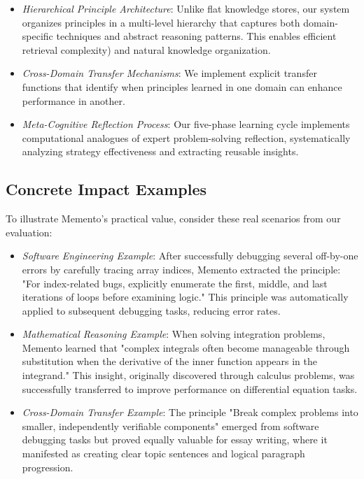 \documentclass[10pt,a4paper,twocolumn]{article}
\begin{document}
\begin{itemize}
\item \textit{Hierarchical Principle Architecture}: Unlike flat knowledge stores, our system organizes principles in a multi-level hierarchy that captures both domain-specific techniques and abstract reasoning patterns. This enables efficient retrieval complexity) and natural knowledge organization.

\item \textit{Cross-Domain Transfer Mechanisms}: We implement explicit transfer functions that identify when principles learned in one domain can enhance performance in another. 

\item \textit{Meta-Cognitive Reflection Process}: Our five-phase learning cycle implements computational analogues of expert problem-solving reflection, systematically analyzing strategy effectiveness and extracting reusable insights.
\end{itemize}

\subsection{Concrete Impact Examples}

To illustrate Memento's practical value, consider these real scenarios from our evaluation:

\begin{itemize}
\item \textit{Software Engineering Example}: After successfully debugging several off-by-one errors by carefully tracing array indices, Memento extracted the principle: "For index-related bugs, explicitly enumerate the first, middle, and last iterations of loops before examining logic." This principle was automatically applied to subsequent debugging tasks, reducing error rates.

\item \textit{Mathematical Reasoning Example}: When solving integration problems, Memento learned that "complex integrals often become manageable through substitution when the derivative of the inner function appears in the integrand." This insight, originally discovered through calculus problems, was successfully transferred to improve performance on differential equation tasks.

\item \textit{Cross-Domain Transfer Example}: The principle "Break complex problems into smaller, independently verifiable components" emerged from software debugging tasks but proved equally valuable for essay writing, where it manifested as creating clear topic sentences and logical paragraph progression.
\end{itemize}
\end{document}

